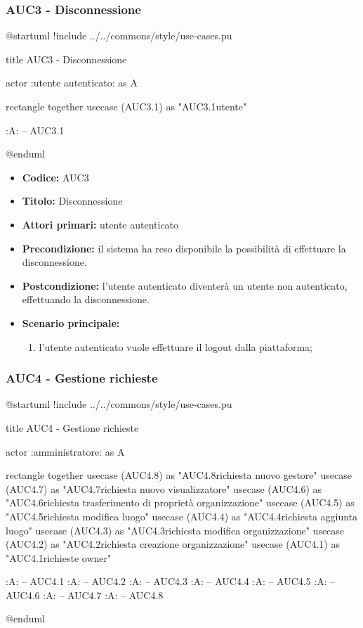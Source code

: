 \documentclass[casi-duso]{subfiles}
\begin{document}
\subsubsection{AUC3 - Disconnessione}%
\label{subsub:AUC3}

\begin{plantuml}
@startuml
!include ../../commons/style/use-cases.pu

title AUC3 - Disconnessione

actor :utente autenticato: as A

rectangle {
  together {
    usecase (AUC3.1) as "AUC3.1\nDisconnessione utente"
  }
}

:A: -- AUC3.1

@enduml
\end{plantuml}

\begin{itemize}
  \item \textbf{Codice:} AUC3
  \item \textbf{Titolo:} Disconnessione
  \item \textbf{Attori primari:} utente autenticato
  \item \textbf{Precondizione:} il sistema ha reso disponibile la possibilità di effettuare la disconnessione.
  \item \textbf{Postcondizione:} l'utente autenticato diventerà un utente non autenticato, effettuando la disconnessione.
  \item \textbf{Scenario principale:} 
  \begin{enumerate}
    \item l'utente autenticato vuole effettuare il logout dalla piattaforma;
  \end{enumerate}
\end{itemize}


\subsubsection{AUC4 - Gestione richieste}%
\label{subsub:AUC4}

\begin{plantuml}
@startuml
!include ../../commons/style/use-cases.pu

title AUC4 - Gestione richieste

actor :amministratore: as A

rectangle {
  together {
    usecase (AUC4.8) as "AUC4.8\nGestione richiesta nuovo gestore"
    usecase (AUC4.7) as "AUC4.7\nGestione richiesta nuovo visualizzatore"
    usecase (AUC4.6) as "AUC4.6\nGestione richiesta trasferimento di proprietà organizzazione"
    usecase (AUC4.5) as "AUC4.5\nGestione richiesta modifica luogo"
    usecase (AUC4.4) as "AUC4.4\nGestione richiesta aggiunta luogo"
    usecase (AUC4.3) as "AUC4.3\nGestione richiesta modifica organizzazione"
    usecase (AUC4.2) as "AUC4.2\nGestione richiesta creazione organizzazione"
    usecase (AUC4.1) as "AUC4.1\nGestione richieste owner"  
  }
}

:A: -- AUC4.1
:A: -- AUC4.2
:A: -- AUC4.3
:A: -- AUC4.4
:A: -- AUC4.5
:A: -- AUC4.6
:A: -- AUC4.7
:A: -- AUC4.8

@enduml

\end{plantuml}
\end{document}
